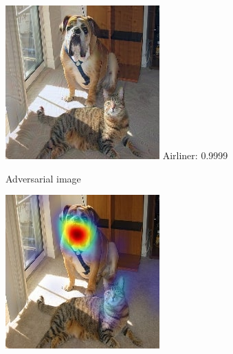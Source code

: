 \begin{figure}[ht!]
\begin{center}
\begin{subfigure}[b]{0.32\linewidth}
        \label{fig:orig_cat_dog}
    \end{subfigure}
    \begin{subfigure}[b]{0.32\linewidth}
        \centering
        \includegraphics[width=1\linewidth]{figures/caffe2_figs/pos_vgg_405_4_cat_dog.jpg}
        \tiny{Airliner: 0.9999\\
        }
		\caption{\tiny{Adversarial image}}
        \label{fig:adv_cat_dog_airliner}
    \end{subfigure}
    \begin{subfigure}[b]{0.32\linewidth}
        \centering
        \includegraphics[width=1\linewidth]{figures/gcam_pos_vgg_405_cat_dog_243.jpg}

\end{subfigure}
\end{center}
\end{figure}
